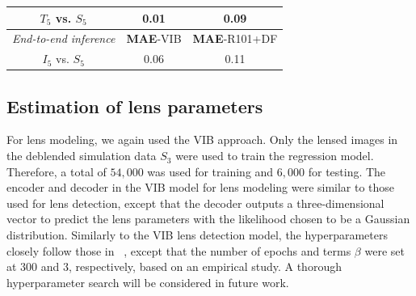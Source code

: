 \documentclass[12pt, twocolumn, apj]{openjournal}
\makeatletter
\newenvironment{subfloat}
    {\def\caption##1{\gdef\subcapsave{\relax##1}}%
        \let\subcapsave=\@empty %
        \let\sf@oldlabel=\label 
        \def\label##1{\xdef\sublabsave{\noexpand\label{##1}}}%
        \let\sublabsave\relax
        \setbox\subfigbox\hbox
            \bgroup}%
            {\egroup
        \let\label=\sf@oldlabel
        \subfigure[\subcapsave]{\box\subfigbox}}%
\makeatother
\begin{document}
\begin{table}[!t]
\begin{subfloat}
\begin{adjustbox}{max width=0.45\textwidth}
\begin{tabular}{|c|c|c|}
                $T_5$ vs. $S_5$ & 0.01 &   0.09  \\ \hline
                 {\it End-to-end inference}& \textbf{MAE}-VIB &\textbf{MAE}-R101+DF\\ \hline
                $I_5$ vs. $S_5$ & 0.06 & 0.11 \\ \hline
                
                \end{tabular}
            \end{adjustbox}
    \end{subfloat}
\end{table}

\subsection{Estimation of lens parameters}

\label{Sec:Results_Regression_training}
For lens modeling, we again used the VIB approach. Only the lensed images in the deblended simulation data $S_3$ were used to train the regression model. Therefore, a total of $54,000$ was used for training and $6,000$  for testing. 
The encoder and decoder in the VIB model for lens modeling were similar to those used for lens detection, except that the decoder outputs a three-dimensional vector to predict the lens parameters with the likelihood chosen to be a Gaussian distribution. Similarly to the VIB lens detection model, the hyperparameters closely follow those in ~\cite{chen2018isolating}, except that the number of epochs and terms $\beta$ were set at $300$ and $3$, respectively, based on an empirical study. A thorough hyperparameter search will be considered in future work.
\end{document}
